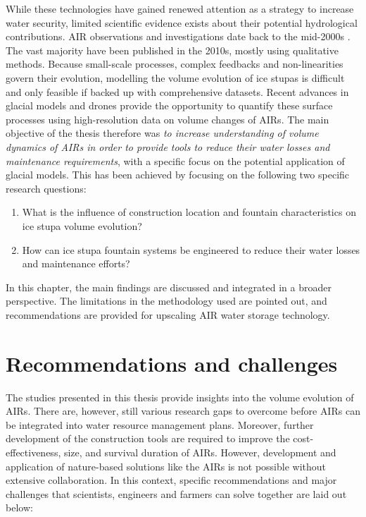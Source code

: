 While these technologies have gained renewed attention as a strategy to increase water security, limited
scientific evidence exists about their potential hydrological contributions. AIR observations and investigations
date back to the mid-2000s \citep{tveitenGlacierGrowingLocal2007}. The vast majority have been published in the
2010s, mostly using qualitative methods. Because small-scale processes, complex feedbacks and non-linearities
govern their evolution, modelling the volume evolution of ice stupas is difficult and only feasible if backed up
with comprehensive datasets. Recent advances in glacial models and drones provide the opportunity to quantify
these surface processes using high-resolution data on volume changes of \ac{AIRs}. The main objective of the
thesis therefore was \textit{to increase understanding of volume dynamics of \ac{AIRs} in order to provide tools
to reduce their water losses and maintenance requirements}, with a specific focus on the potential application
of glacial models. This has been achieved by focusing on the following two specific research questions:

\begin{enumerate}
  \item{What is the influence of construction location and fountain characteristics on ice stupa volume
    evolution?}
  \item{How can ice stupa fountain systems be engineered to reduce their water losses and maintenance efforts?}
\end{enumerate}

In this chapter, the main findings are discussed and integrated in a broader perspective. The limitations in the
methodology used are pointed out, and recommendations are provided for upscaling AIR water storage technology.

\section{Recommendations and challenges}

The studies presented in this thesis provide insights into the volume evolution of \ac{AIRs}. There are,
however, still various research gaps to overcome before \ac{AIRs} can be integrated into water resource
management plans. Moreover, further development of the construction tools are required to improve the
cost-effectiveness, size, and survival duration of \ac{AIRs}. However, development and application of
nature-based solutions like the \ac{AIRs} is not possible without extensive collaboration. In this context,
specific recommendations and major challenges that scientists, engineers and farmers can solve together are laid
out below:

